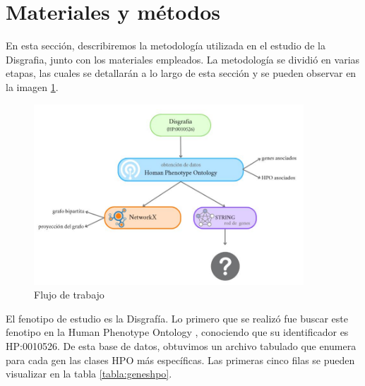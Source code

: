 \section{Materiales y métodos}

En esta sección, describiremos la metodología utilizada en el estudio de la Disgrafia,
junto con los materiales empleados. La metodología se dividió en varias etapas, las
cuales se detallarán a lo largo de esta sección y se pueden observar en la imagen \ref{fig:workflow}.

\begin{figure}[h!]
	\includegraphics[width=0.9\textwidth]{figures/workflow.JPG}
	\caption{Flujo de trabajo}
	\label{fig:workflow}
\end{figure}

El fenotipo de estudio es la Disgrafía. Lo primero que se realizó fue buscar este fenotipo en la Human Phenotype Ontology \cite{HPO2021}, conociendo que su identificador es HP:0010526. De esta base de datos, obtuvimos un archivo tabulado que enumera para cada gen las clases HPO más específicas. Las primeras cinco filas se pueden visualizar en la tabla \ref{tabla:geneshpo}.

\begin{table}[h]
	\centering
	\caption{Cabecera del archivo}
	\label{tabla:geneshpo}
\end{table}

